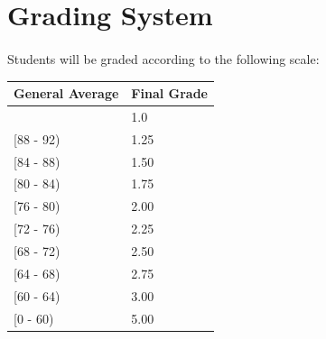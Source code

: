 \documentclass[9pt]{article}
\begin{document}
\section*{Grading System}
	\paragraph{}
	Students will be graded according to the following scale:
	\begin{center}
		\begin{tabular}{|p{2in}|p{2in}|}
			\hline \textbf{General Average} & \textbf{Final Grade}\\
			\hline [92 - 100] & 1.0\\
			\hline [88 - 92) & 1.25\\
			\hline [84 - 88) & 1.50\\
			\hline[80 - 84) & 1.75\\
			\hline [76 - 80) & 2.00\\
			\hline [72 - 76) & 2.25\\
			\hline [68 - 72) & 2.50\\
			\hline [64 - 68) & 2.75\\
			\hline [60 - 64) & 3.00\\
			\hline [0 - 60) & 5.00\\
			\hline
		\end{tabular}
	\end{center}
\end{document}
